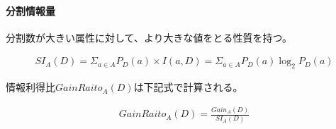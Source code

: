 \documentclass[dvipdfmx]{jsarticle}
\begin{document}
\paragraph{分割情報量}分割数が大きい属性に対して、より大きな値をとる性質を持つ。
\begin{center}
  \begin{align*}
    SI_{A}(D) = \Sigma_{a\in A}P_{D}(a) \times I(a, D) = \Sigma_{a\in A}P_{D}(a)\log_2 P_{D}(a)
  \end{align*}
\end{center}
情報利得比$GainRaito_{A}(D)$は下記式で計算される。
\begin{center}
  \begin{align*}
    GainRaito_{A}(D) = \frac{Gain_{A}(D)}{SI_{A}(D)}
  \end{align*}
\end{center}
\end{document}
